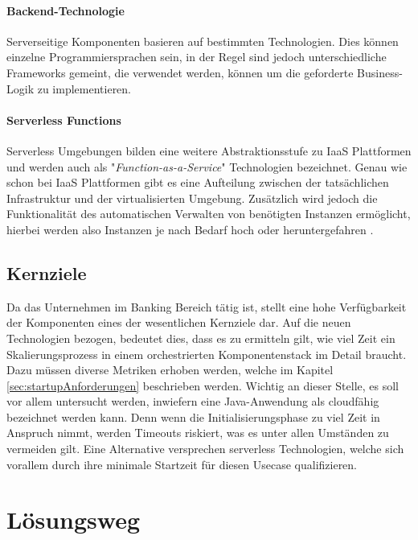 \paragraph{Backend-Technologie}
Serverseitige Komponenten basieren auf bestimmten Technologien. Dies können einzelne Programmiersprachen sein, in der Regel sind jedoch unterschiedliche Frameworks gemeint, die verwendet werden, können um die geforderte Business-Logik zu implementieren.

\paragraph{Serverless Functions}
Serverless Umgebungen bilden eine weitere Abstraktionsstufe zu IaaS Plattformen und werden auch als "\emph{Function-as-a-Service}" Technologien bezeichnet. Genau wie schon bei IaaS Plattformen gibt es eine Aufteilung zwischen der tatsächlichen Infrastruktur und der virtualisierten Umgebung. Zusätzlich wird jedoch die Funktionalität des automatischen Verwalten von benötigten Instanzen ermöglicht, hierbei werden also Instanzen je nach Bedarf hoch oder heruntergefahren \cite[Seite~70 ff.]{continuous-delivery}.

\subsection{Kernziele \checkmark}
Da das Unternehmen im Banking Bereich tätig ist, stellt eine hohe Verfügbarkeit der Komponenten eines der wesentlichen Kernziele dar. Auf die neuen Technologien bezogen, bedeutet dies, dass es zu ermitteln gilt, wie viel Zeit ein Skalierungsprozess in einem orchestrierten Komponentenstack im Detail braucht. Dazu müssen diverse Metriken erhoben werden, welche im Kapitel \ref{sec:startupAnforderungen} beschrieben werden. Wichtig an dieser Stelle, es soll vor allem untersucht werden, inwiefern eine Java-Anwendung als cloudfähig bezeichnet werden kann. Denn wenn die Initialisierungsphase zu viel Zeit in Anspruch nimmt, werden Timeouts riskiert, was es unter allen Umständen zu vermeiden gilt. Eine Alternative versprechen serverless Technologien, welche sich vorallem durch ihre minimale Startzeit für diesen Usecase qualifizieren.


\section{Lösungsweg \checkmark}


